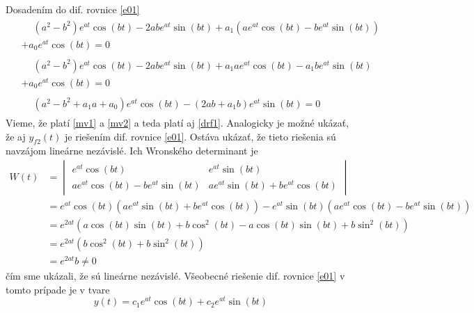 \documentclass[a4paper, 10pt, ]{article}
\begin{document}
Dosadením do dif. rovnice \eqref{e01}
\begin{subequations}
    \begin{align}
        \begin{split}
            &\phantom{+}  \left( a^2 - b^2  \right) e^{at} \cos(bt) - 2 a b e^{at} \sin(bt) 
            +
            a_1 \left( a e^{at} \cos(bt) - b e^{at} \sin(bt) \right) 
            \\&+
            a_0 e^{at} \cos(bt) = 0 
        \end{split} \\
        \begin{split}
            &\phantom{+}  \left( a^2 - b^2  \right) e^{at} \cos(bt) - 2 a b e^{at} \sin(bt) 
            +
            a_1 a e^{at} \cos(bt) - a_1 b e^{at} \sin(bt) 
            \\&+
            a_0 e^{at} \cos(bt) = 0 
        \end{split} \\
        \begin{split}
            &\phantom{+}  \left( a^2 - b^2  + a_1 a + a_0 \right) e^{at} \cos(bt) 
            - 
            \left( 2 a b + a_1 b \right) e^{at} \sin(bt) = 0
        \end{split} \label{drf1}
    \end{align}
\end{subequations}
Vieme, že platí \eqref{mv1} a \eqref{mv2} a teda platí aj \eqref{drf1}. Analogicky je možné ukázať, že aj $y_{f2}(t)$ je riešením dif. rovnice \eqref{e01}. Ostáva ukázať, že tieto riešenia sú navzájom lineárne nezávislé. Ich Wronského determinant je
\begin{equation}
    \begin{aligned}
        W(t) &= \begin{vmatrix}
            e^{at} \cos(bt) & e^{at} \sin(bt) \\
            a e^{at} \cos(bt) - b e^{at} \sin(bt) & a e^{at} \sin(bt) + b e^{at} \cos(bt)
        \end{vmatrix} \\
        &= e^{at} \cos(bt) \left( a e^{at} \sin(bt) + b e^{at} \cos(bt) \right) 
        - e^{at} \sin(bt) \left( a e^{at} \cos(bt) - b e^{at} \sin(bt) \right) \\
        &= e^{2at} \left( a \cos(bt) \sin(bt) + b \cos^2(bt) - a \cos(bt) \sin(bt) + b \sin^2(bt) \right) \\
        &= e^{2at} (b \cos^2(bt) + b \sin^2(bt)) \\
        &= e^{2at} b \neq 0
    \end{aligned}
\end{equation}
čím sme ukázali, že sú lineárne nezávislé. Všeobecné riešenie dif. rovnice \eqref{e01} v tomto prípade je v tvare
\begin{equation}
    y(t) = c_1 e^{at} \cos(bt) + c_2 e^{at} \sin(bt)
\end{equation}



\nocite{*}

\printbibliography[title={Referencie a ďalšia literatúra}]

\end{document}
